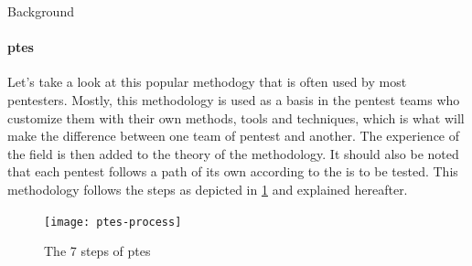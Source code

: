 \begin{chaptercover}{Background}
\paragraph{\acrfull{ptes} \cite{ptes}} Let's take a look at this popular methodogy that is often used by most pentesters. Mostly, this methodology is used as a basis in the pentest teams who customize them with their own methods, tools and techniques, which is what will make the difference between one team of pentest and another. The experience of the field is then added to the theory of the methodology. It should also be noted that each pentest follows a path of its own according to the \acrshort{is} to be tested. This methodology follows the steps as depicted in \ref{fig:ptes-process} and explained hereafter.

\begin{figure}[H]
  \centering
  \texttt{[image: ptes-process]}
  \caption{The 7 steps of \acrshort{ptes}}
  \label{fig:ptes-process}
\end{figure}


\end{chaptercover}
